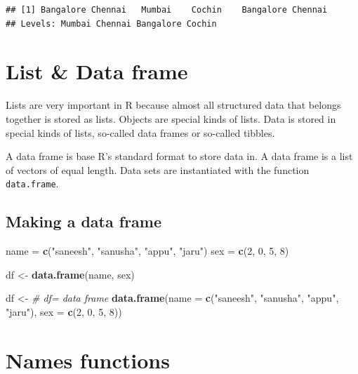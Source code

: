 \documentclass[
]{book}
\newenvironment{Shaded}{\begin{snugshade}}{\end{snugshade}}
\newcommand{\AttributeTok}[1]{\textcolor[rgb]{0.13,0.29,0.53}{#1}}
\newcommand{\CommentTok}[1]{\textcolor[rgb]{0.56,0.35,0.01}{\textit{#1}}}
\newcommand{\DecValTok}[1]{\textcolor[rgb]{0.00,0.00,0.81}{#1}}
\newcommand{\FunctionTok}[1]{\textcolor[rgb]{0.13,0.29,0.53}{\textbf{#1}}}
\newcommand{\NormalTok}[1]{#1}
\newcommand{\OtherTok}[1]{\textcolor[rgb]{0.56,0.35,0.01}{#1}}
\newcommand{\StringTok}[1]{\textcolor[rgb]{0.31,0.60,0.02}{#1}}
\begin{document}
\begin{verbatim}
## [1] Bangalore Chennai   Mumbai    Cochin    Bangalore Chennai  
## Levels: Mumbai Chennai Bangalore Cochin
\end{verbatim}

\hypertarget{list-data-frame}{%
\chapter{List \& Data frame}\label{list-data-frame}}

Lists are very important in R because almost all structured data that belongs together is stored as lists. Objects are special kinds of lists. Data is stored in special kinds of lists, so-called data frames or so-called tibbles.

A data frame is base R's standard format to store data in. A data frame is a list of vectors of equal length. Data sets are instantiated with the function \texttt{data.frame}.

\hypertarget{making-a-data-frame}{%
\section{Making a data frame}\label{making-a-data-frame}}

\begin{Shaded}
\begin{Highlighting}[]
\NormalTok{name }\OtherTok{=} \FunctionTok{c}\NormalTok{(}\StringTok{"saneesh"}\NormalTok{, }\StringTok{"sanusha"}\NormalTok{, }\StringTok{"appu"}\NormalTok{, }\StringTok{"jaru"}\NormalTok{)}
\NormalTok{sex }\OtherTok{=} \FunctionTok{c}\NormalTok{(}\DecValTok{2}\NormalTok{, }\DecValTok{0}\NormalTok{, }\DecValTok{5}\NormalTok{, }\DecValTok{8}\NormalTok{)}

\NormalTok{df }\OtherTok{\textless{}{-}} \FunctionTok{data.frame}\NormalTok{(name, sex)}

\NormalTok{df }\OtherTok{\textless{}{-}} \CommentTok{\# df= data frame}
  \FunctionTok{data.frame}\NormalTok{(}\AttributeTok{name =} \FunctionTok{c}\NormalTok{(}\StringTok{"saneesh"}\NormalTok{, }\StringTok{"sanusha"}\NormalTok{, }\StringTok{"appu"}\NormalTok{, }\StringTok{"jaru"}\NormalTok{),}
             \AttributeTok{sex =} \FunctionTok{c}\NormalTok{(}\DecValTok{2}\NormalTok{, }\DecValTok{0}\NormalTok{, }\DecValTok{5}\NormalTok{, }\DecValTok{8}\NormalTok{))}
\end{Highlighting}
\end{Shaded}

\hypertarget{names-functions}{%
\chapter{Names functions}\label{names-functions}}
\end{document}
